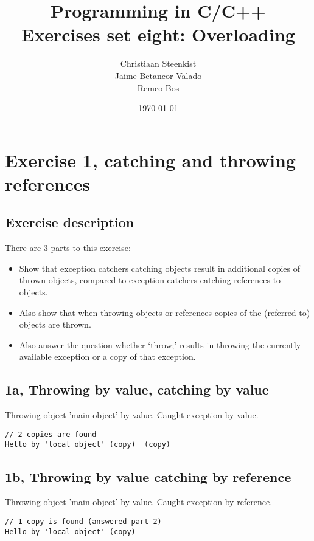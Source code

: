 \documentclass[11pt]{article}
\begin{document}
\title{Programming in C/C++ \\
       Exercises set eight: Overloading
}
\date{\today}
\author{Christiaan Steenkist \\
Jaime Betancor Valado \\
Remco Bos \\
}

\maketitle

\section*{Exercise 1, catching and throwing references}
\subsection*{Exercise description}
There are 3 parts to this exercise:
\begin{itemize}
\item Show that exception catchers catching objects result in additional copies of thrown objects, compared to exception catchers catching references to objects.
\item Also show that when throwing objects or references copies of the (referred to) objects are thrown.
\item Also answer the question whether `throw;' results in throwing the currently available exception or a copy of that exception. 
\end{itemize}

\subsection*{1a, Throwing by value, catching by value}
Throwing object 'main object' by value.
Caught exception by value.
\begin{lstlisting}
// 2 copies are found
Hello by 'local object' (copy)  (copy)
\end{lstlisting}

\subsection*{1b, Throwing by value catching by reference}
Throwing object 'main object' by value.
Caught exception by reference.
\begin{lstlisting}
// 1 copy is found (answered part 2)
Hello by 'local object' (copy)
\end{lstlisting}
\end{document}
